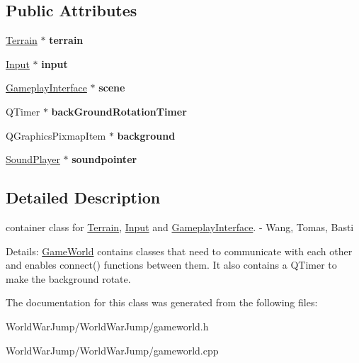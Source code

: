 \subsection*{Public Attributes}
\begin{DoxyCompactItemize}
\item 
\hyperlink{class_terrain}{Terrain} $\ast$ {\bfseries terrain}\hypertarget{class_game_world_a97a0e2bf2693f10e7ab7481ada618191}{}\label{class_game_world_a97a0e2bf2693f10e7ab7481ada618191}

\item 
\hyperlink{class_input}{Input} $\ast$ {\bfseries input}\hypertarget{class_game_world_af51a9a6f7f2f318a7f4842bc7ddddf67}{}\label{class_game_world_af51a9a6f7f2f318a7f4842bc7ddddf67}

\item 
\hyperlink{class_gameplay_interface}{Gameplay\+Interface} $\ast$ {\bfseries scene}\hypertarget{class_game_world_a470317d29e5b698b1e08dc983d78ff50}{}\label{class_game_world_a470317d29e5b698b1e08dc983d78ff50}

\item 
Q\+Timer $\ast$ {\bfseries back\+Ground\+Rotation\+Timer}\hypertarget{class_game_world_a12fff5decf2e34382c409923ec6f4668}{}\label{class_game_world_a12fff5decf2e34382c409923ec6f4668}

\item 
Q\+Graphics\+Pixmap\+Item $\ast$ {\bfseries background}\hypertarget{class_game_world_a42c3f3a06320763c952771c93f49489d}{}\label{class_game_world_a42c3f3a06320763c952771c93f49489d}

\item 
\hyperlink{class_sound_player}{Sound\+Player} $\ast$ {\bfseries soundpointer}\hypertarget{class_game_world_a133678d6bc4754bff909f0e744923549}{}\label{class_game_world_a133678d6bc4754bff909f0e744923549}

\end{DoxyCompactItemize}


\subsection{Detailed Description}
container class for \hyperlink{class_terrain}{Terrain}, \hyperlink{class_input}{Input} and \hyperlink{class_gameplay_interface}{Gameplay\+Interface}. -\/ Wang, Tomas, Basti 

Details\+: \hyperlink{class_game_world}{Game\+World} contains classes that need to communicate with each other and enables connect() functions between them. It also contains a Q\+Timer to make the background rotate. 

The documentation for this class was generated from the following files\+:\begin{DoxyCompactItemize}
\item 
World\+War\+Jump/\+World\+War\+Jump/gameworld.\+h\item 
World\+War\+Jump/\+World\+War\+Jump/gameworld.\+cpp\end{DoxyCompactItemize}
